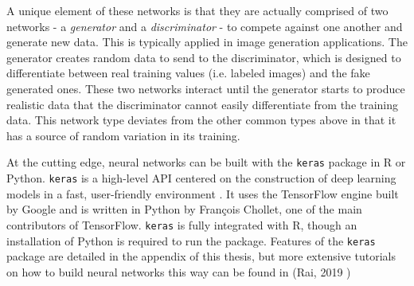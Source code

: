 A unique element of these networks is that they are actually comprised of two networks - a \textit{generator} and a \textit{discriminator} - to compete against one another and generate new data.  This is typically applied in image generation applications.  The generator creates random data to send to the discriminator, which is designed to differentiate between real training values (i.e. labeled images) and the fake generated ones.  These two networks interact until the generator starts to produce realistic data that the discriminator cannot easily differentiate from the training data.  This network type deviates from the other common types above in that it has a source of random variation in its training.



At the cutting edge, neural networks can be built with the \texttt{keras} package in R or Python. \texttt{keras} is a high-level API centered
on the construction of deep learning models in a fast, user-friendly environment \cite{tensorflow2015-whitepaper}. It uses the TensorFlow engine built by Google and
is written in Python by François Chollet, one of the main contributors of TensorFlow. \texttt{keras} is fully integrated with
R, though an installation of Python is required to run the package. Features of the \texttt{keras} package are detailed in the appendix of this thesis, but more extensive tutorials on how to build neural networks this way can be found in (Rai, 2019 \cite{rai})